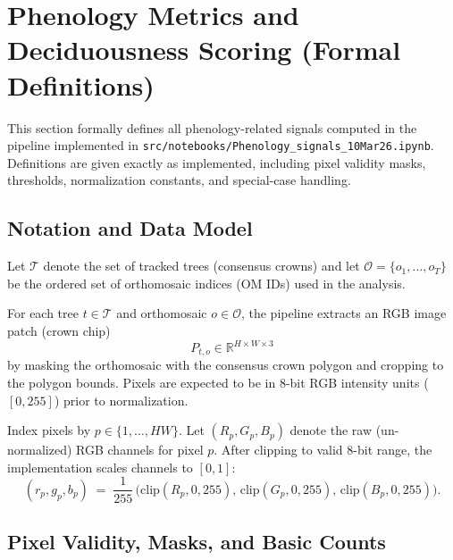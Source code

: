 \section{Phenology Metrics and Deciduousness Scoring (Formal Definitions)}
\label{sec:phenology-formal}

This section formally defines all phenology-related signals computed in the pipeline implemented in
\texttt{src/notebooks/Phenology\_signals\_10Mar26.ipynb}. Definitions are given exactly as implemented,
including pixel validity masks, thresholds, normalization constants, and special-case handling.

\subsection{Notation and Data Model}

Let $\mathcal{T}$ denote the set of tracked trees (consensus crowns) and let $\mathcal{O}=\{o_1,\dots,o_T\}$
be the ordered set of orthomosaic indices (OM IDs) used in the analysis.

For each tree $t\in\mathcal{T}$ and orthomosaic $o\in\mathcal{O}$, the pipeline extracts an RGB image patch
(crown chip)
\begin{equation}
P_{t,o}\in\mathbb{R}^{H\times W\times 3}
\end{equation}
by masking the orthomosaic with the consensus crown polygon and cropping to the polygon bounds.
Pixels are expected to be in 8-bit RGB intensity units ($[0,255]$) prior to normalization.

Index pixels by $p\in\{1,\dots,HW\}$. Let $(R_p,G_p,B_p)$ denote the raw (un-normalized) RGB channels for pixel $p$.
After clipping to valid 8-bit range, the implementation scales channels to $[0,1]$:
\begin{equation}
(r_p,g_p,b_p) \;=\; \frac{1}{255}\,\bigl(\mathrm{clip}(R_p,0,255),\,\mathrm{clip}(G_p,0,255),\,\mathrm{clip}(B_p,0,255)\bigr).
\end{equation}

\subsection{Pixel Validity, Masks, and Basic Counts}

